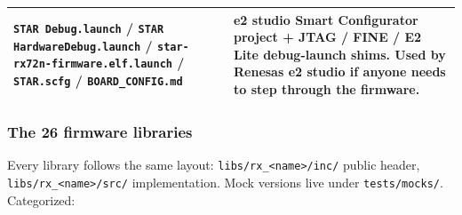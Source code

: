 \begin{center}
\begin{tabular}{|p{3.5cm}|p{10.5cm}|}
\texttt{STAR Debug.launch} / \texttt{STAR HardwareDebug.launch} / \texttt{star-rx72n-firmware.elf.launch} / \texttt{STAR.scfg} / \texttt{BOARD\_CONFIG.md} & e2 studio Smart Configurator project + JTAG / FINE / E2 Lite debug-launch shims. Used by Renesas e2 studio if anyone needs to step through the firmware.                                                                       \\
\hline
\end{tabular}
\end{center}

\subsubsection{The 26 firmware libraries}
\label{section:firmware-libs}

Every library follows the same layout: \texttt{libs/rx\_<name>/inc/}
public header, \texttt{libs/rx\_<name>/src/} implementation. Mock
versions live under \texttt{tests/mocks/}. Categorized:

